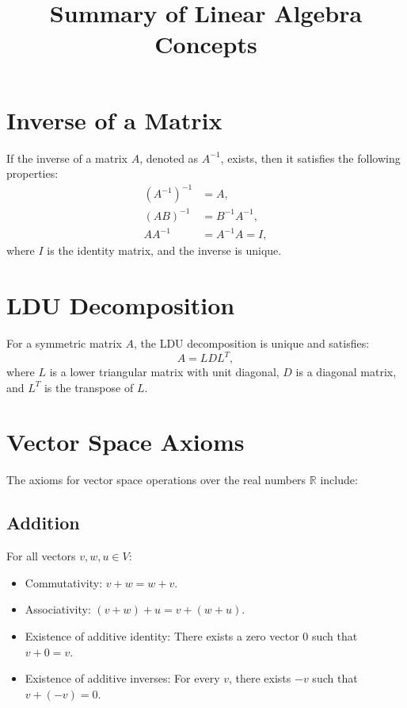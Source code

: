 \documentclass{article}
\begin{document}
\title{Summary of Linear Algebra Concepts}
\author{}
\date{} %
\maketitle

\section*{Inverse of a Matrix}
If the inverse of a matrix $A$, denoted as $A^{-1}$, exists, then it satisfies the following properties:
\begin{align*}
    (A^{-1})^{-1} &= A, \\
    (AB)^{-1} &= B^{-1}A^{-1}, \\
    AA^{-1} &= A^{-1}A = I,
\end{align*}
where $I$ is the identity matrix, and the inverse is unique.

\section*{LDU Decomposition}
For a symmetric matrix $A$, the LDU decomposition is unique and satisfies:
\begin{equation*}
    A = LDL^T,
\end{equation*}
where $L$ is a lower triangular matrix with unit diagonal, $D$ is a diagonal matrix, and $L^T$ is the transpose of $L$.

\section*{Vector Space Axioms}
The axioms for vector space operations over the real numbers $\mathbb{R}$ include:
\subsection*{Addition}
For all vectors $v, w, u \in V$:
\begin{itemize}
    \item Commutativity: $v + w = w + v$.
    \item Associativity: $(v + w) + u = v + (w + u)$.
    \item Existence of additive identity: There exists a zero vector $0$ such that $v + 0 = v$.
    \item Existence of additive inverses: For every $v$, there exists $-v$ such that $v + (-v) = 0$.
\end{itemize}
\end{document}

